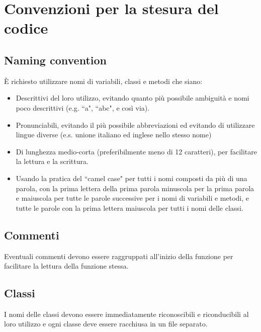 \documentclass[12pt,a4paper]{article}
\begin{document}
\section{Convenzioni per la stesura del codice}

\subsection{Naming convention}
\`E richiesto utilizzare nomi di variabili, classi e metodi che siano:

\begin{itemize}
\item Descrittivi del loro utilizzo, evitando quanto più possibile ambiguità e nomi poco descrittivi (e.g. ``a", ``abc", e così via).
\item Pronunciabili, evitando il più possibile abbreviazioni ed evitando di utilizzare lingue diverse (e.s. unione italiano ed inglese nello stesso nome)
\item Di lunghezza medio-corta (preferibilmente meno di 12 caratteri), per facilitare la lettura e la scrittura.
\item Usando la pratica del ``camel case" per tutti i nomi composti da pi\`u di una parola, con la prima lettera della prima parola minuscola per la prima parola e maiuscola per tutte le parole successive per i nomi di variabili e metodi, e tutte le parole con la prima lettera maiuscola per tutti i nomi delle classi.
\

\end{itemize}

\subsection{Commenti}
Eventuali commenti devono essere raggruppati all'inizio della funzione per facilitare la lettura della funzione stessa.

\newpage

\subsection{Classi}
I nomi delle classi devono essere immediatamente riconoscibili e riconducibili al loro utilizzo e ogni classe deve essere racchiusa in un file separato. \\
\end{document}
